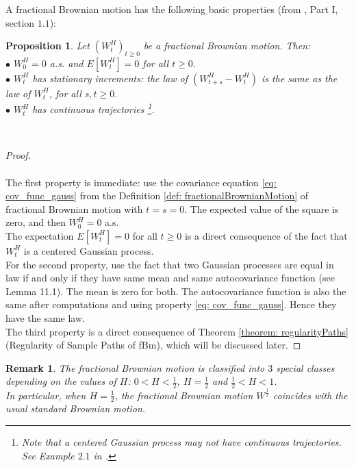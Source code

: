 \documentclass[a4paper,italian,11pt]{book}
\newtheorem{remark}{Remark}
\theoremstyle{plain}
\theoremstyle{remark}
\theoremstyle{plain}
\newtheorem{proposition}{Proposition}
\begin{document}
A fractional Brownian motion has the following basic properties (from \cite{ZhangBook}, Part I, section $1.1$):
\begin{proposition} 
Let $(W^H_t)_{t\ge 0}$ be a fractional Brownian motion. Then:
\\
$\bullet$ $W^H_0 = 0$ a.s. and $E[W^H_t] = 0$ for all $t\ge 0$.
\\
$\bullet$ $W^H_t$ has stationary increments: the law of $\left( W^H_{t+s}-W^H_t \right)$ is the same as the law of $W^H_t$, for all $s,t\ge 0$.
\\
$\bullet$ $W^H_t$ has continuous trajectories \footnote{Note that a centered Gaussian process may not have continuous trajectories. See Example $2.1$ in \cite{StevenGaussian}.}.
\end{proposition}
\\
\begin{proof}
\\\
\\
The first property is immediate: use the covariance equation \eqref{eq: cov_func_gauss} from the Definition \ref{def: fractionalBrownianMotion} of fractional Brownian motion with $t=s=0$. The expected value of the square is zero, and then $W^H_0=0$ a.s. \\
The expectation $E[W^H_t]=0$ for all $t\ge 0$ is a direct consequence of the fact that $W^H_t$ is a centered Gaussian process. \\
For the second property, use the fact that two Gaussian processes are equal in law if and only if they have same mean and same autocovariance function (see \cite{lemma11.1} Lemma 11.1). 
The mean is zero for both. The autocovariance function is also the same after computations and using property \eqref{eq: cov_func_gauss}. Hence they have the same law. \\
The third property is a direct consequence of Theorem \ref{theorem: regularityPaths} (Regularity of Sample Paths of fBm), which will be discussed later.

\end{proof}

\begin{remark}
The fractional Brownian motion is classified into $3$ special classes depending on the values of $H$:  $0<H<\frac{1}{2}$, $H=\frac{1}{2}$ and $\frac{1}{2}<H<1$.\\
In particular, when $H=\frac{1}{2}$, the fractional Brownian motion $W^\frac{1}{2}$ coincides with the usual standard Brownian motion.
\end{remark}
\end{document}
